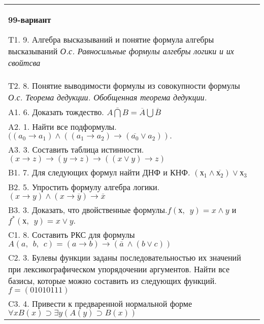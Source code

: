 \documentclass{article}
\begin{document}
\begin{tabular}{m{17cm}}
\textbf{99-вариант}
\newline

T1. 9. Алгебра высказываний и понятие формула алгебры высказываний \emph{О.с. Равносильные формулы алгебры логики и их свойтсва} \\
T2. 8. Понятие выводимости формулы из совокупности формулы \emph{О.с. Теорема дедукции. Обобщенная теорема дедукции.} \\
A1. 6. Доказать тождество. \(\overline{A\bigcap B} = \overline{A}\bigcup\overline{B}\) \\
A2. 1. Найти все подформулы. \(((a_{0} \rightarrow a_{1}) \land ((a_{1} \rightarrow a_{2}) \rightarrow (\overline{a_{0}} \vee a_{2})).\) \\
A3. 3. Составить таблица истинности. \((x \rightarrow z) \rightarrow (y \rightarrow z) \rightarrow ((x \vee y) \rightarrow z)\) \\
B1. 7. Для следующих формул найти ДНФ и КНФ. \(\left( х_{1} \land \overline{х_{2}} \right) \vee х_{3}\) \\
B2. 5. Упростить формулу алгебра логики. \((x \rightarrow y) \land (x \rightarrow \overline{y}) \rightarrow \overline{x}\) \\
B3. 3. Доказать, что двойственные формулы.\(f(х,\ \ y) = x \land y\) и \(f^{*}(х,\ \ y) = x \vee y.\) \\
C1. 8. Составить РКС для формулы \(A(a,\ \ b,\ \ c) = (a \rightarrow b) \rightarrow (\overline{a}\  \land (b \vee c))\) \\
C2. 3. Булевы функции заданы последовательностью их значений при лексикографическом упорядочении аргументов. Найти все базисы, которые можно составить из следующих функций. \(f = (01010111)\) \\
C3. 4. Привести к предваренной нормальной форме \(\forall xB(x) \supset \exists y(A(y) \supset B(x))\) \\

\end{tabular}
\vspace{1cm}
\end{document}
